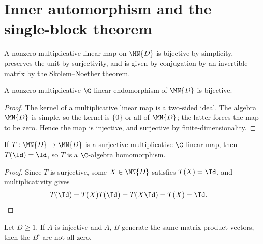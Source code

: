 \section{Inner automorphism and the single-block theorem}

A nonzero multiplicative linear map on $\MN{D}$ is bijective by simplicity,
preserves the unit by surjectivity, and is given by conjugation by an
invertible matrix by the Skolem--Noether theorem.

\begin{lemma}%
    \label{thm:simplicity}
    \leanok
    A nonzero multiplicative $\C$-linear endomorphism of $\MN{D}$ is bijective.
\end{lemma}

\begin{proof}
    \leanok
    The kernel of a multiplicative linear map is a two-sided ideal. The algebra
    $\MN{D}$ is simple, so the kernel is $\{0\}$ or all of $\MN{D}$; the latter
    forces the map to be zero. Hence the map is injective, and surjective by
    finite-dimensionality.
\end{proof}

\begin{lemma}\label{lem:linear_map_to_alg}
    \leanok
    If $T : \MN{D} \to \MN{D}$ is a surjective multiplicative $\C$-linear map,
    then $T(\Id) = \Id$, so $T$ is a $\C$-algebra homomorphism.
\end{lemma}

\begin{proof}
    \leanok
    Since $T$ is surjective, some $X \in \MN{D}$ satisfies $T(X) = \Id$, and
    multiplicativity gives
    \begin{align}
        T(\Id) & = T(X)T(\Id) = T(X\Id) = T(X) = \Id.
        \notag
    \end{align}
\end{proof}

\begin{lemma}\label{lem:trace_ne_zero}
    \leanok
    Let $D \ge 1$. If $A$ is injective and $A$, $B$ generate the same
    matrix-product vectors, then the $B^i$ are not all zero.
\end{lemma}

